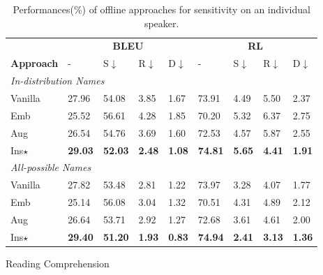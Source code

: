 \begin{table}[h!]
	\begin{subtable}{\linewidth}
		\scriptsize
		\centering
		\begin{tabular}{p{0.9cm}|p{0.36cm}p{0.36cm}p{0.36cm}p{0.36cm}|p{0.36cm}p{0.36cm}p{0.36cm}p{0.36cm}}
			\toprule[1pt]
			 & \multicolumn{4}{c|}{\textbf{BLEU}} & \multicolumn{4}{c}{\textbf{RL}} \\
			\textbf{Approach}& - & S$\downarrow$  & R$\downarrow$ & D$\downarrow$& - & S$\downarrow$ & R$\downarrow$ & D$\downarrow$ \\
			
			\hline
			\multicolumn{7}{l}{\textit{In-distribution Names}}\\
			Vanilla &
			27.96 &54.08& 3.85 & 1.67 & 73.91 &4.49 & 5.50 & 2.37\\
			Emb & 25.52 & 56.61 & 4.28 & 1.85&70.20& 5.32 & 6.37& 2.75 \\
			Aug  &
			26.54 &  54.76 & 3.69 & 1.60&72.53&4.57& 5.87& 2.55 \\
			Ins$\star$& \textbf{29.03} &\textbf{52.03}  & \textbf{2.48} & \textbf{1.08}& \textbf{74.81}&\textbf{5.65}& \textbf{4.41}& \textbf{1.91}  \\
			
			\hline
			\multicolumn{7}{l}{\textit{All-possible Names}}\\
			Vanilla&
			27.82 &53.48 & 2.81 & 1.22 &73.97 & 3.28& 4.07& 1.77 \\
			Emb & 25.14 & 56.08 & 3.04 & 1.32 &70.51&4.31& 4.89 & 2.12 \\
			Aug &
			26.64 &  53.71 & 2.92& 1.27 &72.68&3.61& 4.61& 2.00  \\
			Ins$\star$  & \textbf{29.40} & \textbf{51.20}& \textbf{1.93} & \textbf{0.83} & \textbf{74.94}&\textbf{2.41} & \textbf{3.13}& \textbf{1.36} \\
			\bottomrule[1pt]
		\end{tabular}
		\caption{Reading Comprehension}
	\end{subtable}
	\caption{Performances(\%) of offline approaches for sensitivity on an individual speaker.}	
	\label{tab:speaker-off}
\end{table}




